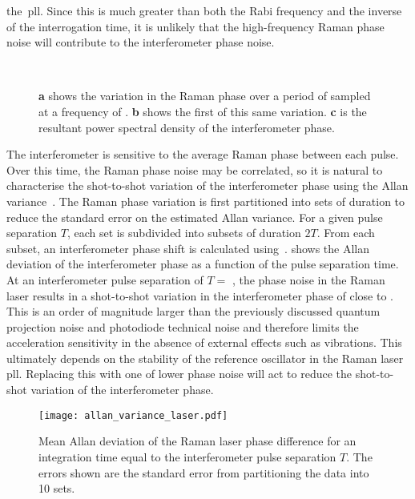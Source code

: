 the~\ac{pll}. Since this is much greater than both the Rabi frequency
and the inverse of the interrogation time, it is unlikely that the
high-frequency Raman phase noise will contribute to the interferometer
phase noise.
\begin{figure}[htpb!]
  \centering
{}
\\
\caption[Interferometer phase noise due to the Raman phase]{\textbf{a}
  shows the variation in the Raman phase over a period of
   sampled at a frequency of .
  \textbf{b} shows the first  of this same variation.
  \textbf{c} is the resultant power spectral density of the
interferometer phase.}
  \label{fig:laser_phase_noise}
\end{figure}
\par\noindent
The interferometer is sensitive to the average Raman phase between
each pulse. Over this time, the Raman phase noise may be correlated,
so it is natural to characterise the shot-to-shot variation of the
interferometer phase using the
Allan variance~\cite{Gouet2008}. The Raman phase
variation is first partitioned into sets of duration 
to reduce the standard error on the estimated Allan variance. For a
given pulse separation $T$, each set is subdivided into subsets of
duration $2T$. 
From each subset, an interferometer phase shift is calculated using~.
 shows the Allan deviation of the
interferometer phase as a function of the pulse separation time. At an interferometer pulse
separation of
\(T = \) , the phase noise in the Raman
laser results in a shot-to-shot variation in the interferometer phase
of close to . This is an order of magnitude
larger than the previously discussed quantum projection noise and photodiode technical
noise and therefore limits the acceleration sensitivity in the absence
of external effects such as vibrations. This ultimately depends on the
stability of the reference oscillator in the Raman laser \ac{pll}.
Replacing this with one of lower phase noise will act to reduce the
shot-to-shot variation of the interferometer phase. 
\begin{figure}[htpb!]
  \centering
  \texttt{[image: allan\_variance\_laser.pdf]}
  \caption[Allan deviation of the Raman laser phase difference.]{Mean Allan
    deviation of the Raman laser phase difference for an integration
  time equal to the interferometer pulse separation $T$. The errors
shown are the standard error from partitioning the data into 10 sets.} 
  \label{fig:allan_dev_m2}
\end{figure}

